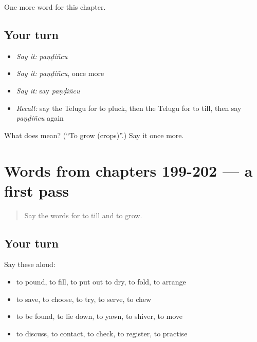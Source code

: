 \begin{grammarlens}[title={What you've built}]
One more word for this chapter.
\end{grammarlens}

\subsection*{Your turn}
\begin{itemize}
\raggedright
  \item \emph{Say it:} \emph{paṇḍiñcu}
  \item \emph{Say it:} \emph{paṇḍiñcu}, once more
  \item \emph{Say it:} say \emph{paṇḍiñcu}
  \item \emph{Recall:} say the Telugu for to pluck, then the Telugu for to till, then say \emph{paṇḍiñcu} again
\end{itemize}

\begin{tcolorbox}[breakable,colback=teal!4,colframe=teal!35!black,title={Before you move on}]
What does  mean? (\textquotedblleft{}To grow (crops)\textquotedblright{}.) Say it once more.
\end{tcolorbox}
\section[(dialogue)]{Words from chapters 199-202 — a first pass}

\label{lesson:TE-R207-first-pass-words-from-chapters-199-202}



\begin{quote}
Say the words for to till and to grow.
\end{quote}

\subsection*{Your turn}
Say these aloud:

\begin{itemize}
\raggedright
  \item to pound, to fill, to put out to dry, to fold, to arrange
  \item to save, to choose, to try, to serve, to chew
  \item to be found, to lie down, to yawn, to shiver, to move
  \item to discuss, to contact, to check, to register, to practise
\end{itemize}

